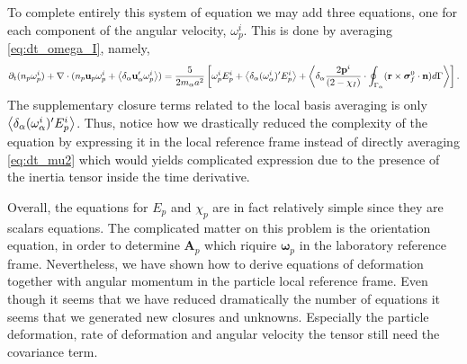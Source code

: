 To complete entirely this system of equation we may add three equations, one for each component of the angular velocity, $\omega_p^i$. 
This is done by averaging \ref{eq:dt_omega_I}, namely,
\begin{align*}
    \partial_t (n_p \omega^i_p)
    + \mathbf{\nabla}\cdot (
        n_p \textbf{u}_p \omega^i_p 
        + \left<\delta_\alpha \textbf{u}_\alpha' \omega^i_p\right>
    )
    = 
    \frac{5}{2 m_\alpha a^2}\left[
        \omega^i_p E^i_p + \left<\delta_\alpha (\omega^i_\alpha)' E^i_p\right>
        +\left<\delta_\alpha 
        \frac{2 \textbf{p}^i}{ (2 - \chi_I)}\cdot 
        \oint_{\Gamma_{\alpha}} (\textbf{r}\times\bm\sigma_f^0\cdot \textbf{n}) d\Gamma 
        \right>
    \right]. 
\end{align*}
The supplementary closure terms related to the local basis averaging is only $\left<\delta_\alpha (\omega^i_\alpha)' E^i_p\right>$.
Thus, notice how we drastically reduced the complexity of the equation by expressing it in the local reference frame instead of directly averaging \ref{eq:dt_mu2} which would yields complicated expression due to the presence of the inertia tensor inside the time derivative.  


Overall,  the equations for $E_p$ and $\chi_p$ are in fact relatively simple since they are scalars equations. 
The complicated matter on this problem is the orientation equation, in order to determine $\textbf{A}_p$ which riquire $\bm\omega_p$ in the laboratory reference frame. 
Nevertheless, we have shown how to derive equations of deformation together with angular momentum in the particle local reference frame. 
Even though it seems that we have reduced dramatically the number of equations it seems that we generated new closures and unknowns. 
Especially the particle deformation, rate of deformation and angular velocity the tensor still need the covariance term.
